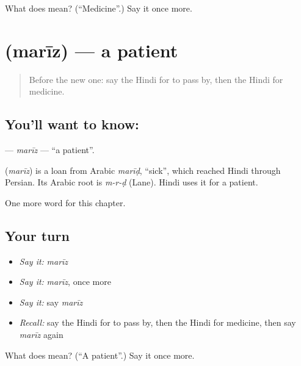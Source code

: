 \begin{tcolorbox}[breakable,colback=teal!4,colframe=teal!35!black,title={Before you move on}]
What does  mean? (\textquotedblleft{}Medicine\textquotedblright{}.) Say it once more.
\end{tcolorbox}
\section[\texorpdfstring{\hi{मरीज़} (marīz)}{मरीज़ (marīz)}]{ (marīz) — a patient}

\label{lesson:HI-C180-mariz}



\begin{quote}
Before the new one: say the Hindi for to pass by, then the Hindi for medicine.
\end{quote}

\subsection*{You'll want to know: }
\textbf{} — \emph{marīz} — \textquotedblleft{}a patient\textquotedblright{}.

\begin{cousinweb}
\textbf{} (\emph{marīz}) is a loan from Arabic \emph{marīḍ}, \textquotedblleft{}sick\textquotedblright{}, which reached Hindi through Persian. Its Arabic root is \emph{m-r-ḍ} (Lane). Hindi uses it for a patient.
\end{cousinweb}

\begin{grammarlens}[title={What you've built}]
One more word for this chapter.
\end{grammarlens}

\subsection*{Your turn}
\begin{itemize}
\raggedright
  \item \emph{Say it:} \emph{marīz}
  \item \emph{Say it:} \emph{marīz}, once more
  \item \emph{Say it:} say \emph{marīz}
  \item \emph{Recall:} say the Hindi for to pass by, then the Hindi for medicine, then say \emph{marīz} again
\end{itemize}

\begin{tcolorbox}[breakable,colback=teal!4,colframe=teal!35!black,title={Before you move on}]
What does  mean? (\textquotedblleft{}A patient\textquotedblright{}.) Say it once more.
\end{tcolorbox}
